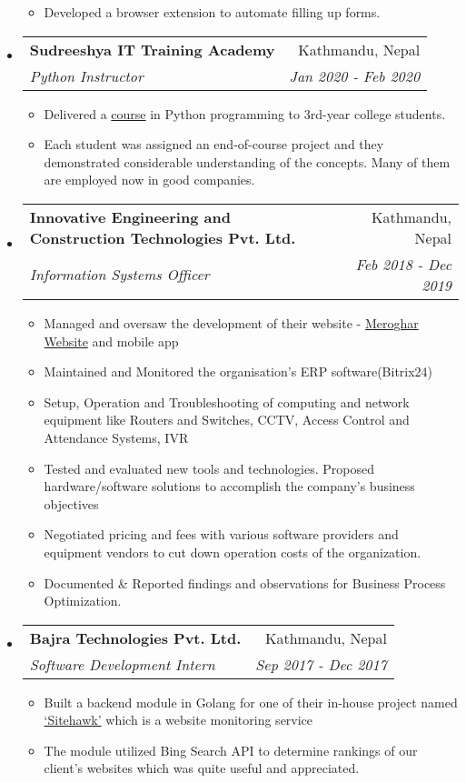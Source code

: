 \documentclass[letterpaper,11pt]{article}
\makeatletter
\newcommand{\cvsubheading}[4]{
\begin{tabular*}{6.5in}{l@{\cftdotfill{\cftsecdotsep}\extracolsep{\fill}}r}
        \textbf{#1} & #2 \\
        \textit{#3} & \textit{#4} \\
\end{tabular*}\vspace{-6pt}}
\newcommand{\cvitem}[1]{\item #1 \vspace{-2pt}}
\makeatother
\begin{document}
\begin{itemize}
\begin{itemize}
                  \cvitem{Developed a browser extension to automate filling up forms.}
            \end{itemize}

      \item
            \cvsubheading{Sudreeshya IT Training Academy}{Kathmandu, Nepal}{Python Instructor}{Jan 2020 - Feb 2020}
            \begin{itemize}
                  \cvitem{Delivered a \href{https://github.com/leabstrait/basic-python-class}{course} in Python programming to 3rd-year college students.}
                  \cvitem{Each student was assigned an end-of-course project and they demonstrated considerable understanding of the concepts. Many of them are employed now in good companies.}
            \end{itemize}

      \item
            \cvsubheading{Innovative Engineering and Construction Technologies Pvt. Ltd.}{Kathmandu, Nepal}{Information Systems Officer}{Feb 2018  - Dec 2019}
            \begin{itemize}
                  \cvitem{Managed and oversaw the development of their website - \href{https://meroghar.com}{Meroghar Website} and mobile app}
                  \cvitem{Maintained and Monitored the organisation’s ERP software(Bitrix24)}
                  \cvitem{Setup, Operation and Troubleshooting of computing and network equipment like Routers and Switches, CCTV, Access Control and Attendance Systems, IVR}
                  \cvitem{Tested and evaluated new tools and technologies. Proposed hardware/software solutions to accomplish the company's business objectives}
                  \cvitem{Negotiated pricing and fees with various software providers and equipment vendors to cut down operation costs of the organization.}
                  \cvitem{Documented \& Reported findings and observations for Business Process Optimization.}
            \end{itemize}

      \item
            \cvsubheading{Bajra Technologies Pvt. Ltd.}{Kathmandu, Nepal}{Software Development Intern}{Sep 2017 - Dec 2017}
            \begin{itemize}
                  \cvitem{Built a backend module in Golang for one of their in-house project named \href{https://sitehawk.io}{‘Sitehawk’} which is a website monitoring service}
                  \cvitem{The module utilized Bing Search API to determine rankings of our client's websites which was quite useful and appreciated.}
            \end{itemize}


\end{itemize}
\end{document}
